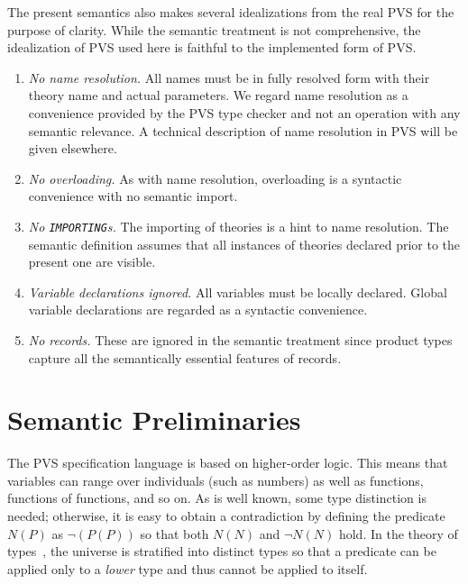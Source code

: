 \documentclass [12pt,twoside]{cslreport}
\begin{document}
The present semantics also makes several idealizations from the real
PVS for 
the purpose of clarity.  While the semantic treatment is not
comprehensive, the idealization of PVS used here is faithful to the
implemented form of PVS.   

\begin{enumerate}
  \item \emph{No name resolution.}  All names must be in fully resolved form
with their theory name and actual parameters.  We regard name resolution as
a convenience provided by the PVS type checker and not an operation with any
semantic relevance.  A technical description of name resolution in PVS will
be given elsewhere.


  \item \emph{No overloading.}   As with name resolution, overloading is
a syntactic convenience with no semantic import. 

\item \emph{No \texttt{IMPORTING}s.}  The importing of theories is a 
hint to  name resolution.  The semantic definition assumes that all
instances of theories declared prior to the present one are visible.   
  \item \emph{Variable declarations ignored.}  All variables must be 
locally declared.   Global variable declarations are regarded as a syntactic
convenience.  
  \item \emph{No records.}  These are ignored in the semantic treatment
since product types capture all the semantically essential features of records.
\end{enumerate}


\section{Semantic Preliminaries}

The PVS specification language is based on higher-order logic.  This means
that variables can range over individuals (such as numbers) as well as
functions, functions of functions, and so on.  As is well known, some type
distinction is needed; otherwise, it is easy to obtain a
contradiction by defining the predicate $N(P)$ as $ \neg(P(P))$ so that
both $N(N)$ and $\neg N(N)$ hold.  
In the theory of types~\cite{Church:types}, the universe is stratified
into distinct types 
so that a predicate can  be applied only to a \emph{lower} type
and thus cannot be applied to itself.
\end{document}
